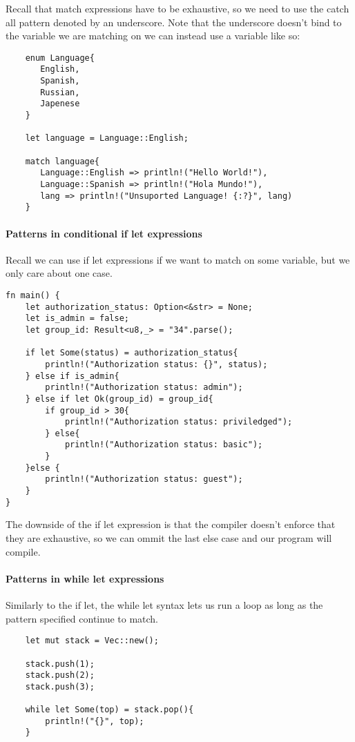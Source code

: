 Recall that match expressions have to be exhaustive, so we need to use the catch all pattern denoted by an underscore. Note that the underscore doesn't bind to the variable we are matching on we can instead use a variable like so:\begin{lstlisting}
    enum Language{
       English,
       Spanish,
       Russian,
       Japenese
    }
   
    let language = Language::English;
   
    match language{
       Language::English => println!("Hello World!"),
       Language::Spanish => println!("Hola Mundo!"),
       lang => println!("Unsuported Language! {:?}", lang)
    }
   \end{lstlisting}

\paragraph*{Patterns in conditional if let expressions}

Recall we can use if let expressions if we want to match on some variable, but we only care about one case.\begin{lstlisting}
fn main() {
    let authorization_status: Option<&str> = None;
    let is_admin = false;
    let group_id: Result<u8,_> = "34".parse();

    if let Some(status) = authorization_status{
        println!("Authorization status: {}", status);
    } else if is_admin{
        println!("Authorization status: admin");
    } else if let Ok(group_id) = group_id{
        if group_id > 30{
            println!("Authorization status: priviledged");
        } else{
            println!("Authorization status: basic");
        }
    }else {
        println!("Authorization status: guest");
    }
}
\end{lstlisting}
The downside of the if let expression is that the compiler doesn't enforce that they are exhaustive, so we can ommit the last else case and our program will compile.

\paragraph*{Patterns in while let expressions}

Similarly to the if let, the while let syntax lets us run a loop as long as the pattern specified continue to match. \begin{lstlisting}
    let mut stack = Vec::new();

    stack.push(1);
    stack.push(2);
    stack.push(3);

    while let Some(top) = stack.pop(){
        println!("{}", top);
    }
\end{lstlisting}

